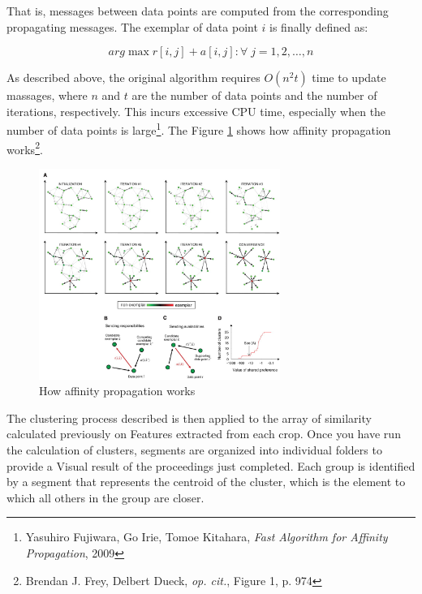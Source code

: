 That is, messages between data points are computed from the corresponding propagating messages. The exemplar of data point $i$ is finally defined as:

$$arg \max {r[i, j] + a[i, j] : \forall \; j = 1, 2, \ldots,n}$$

As described above, the original algorithm requires $O(n^2 t)$ time to update massages, where $n$ and $t$ are the number of data points and the number of iterations, respectively.
This incurs excessive CPU time, especially when the number of data points is large\footnote{Yasuhiro Fujiwara, Go Irie, Tomoe Kitahara, \emph{Fast Algorithm for Affinity Propagation}, 2009}. The Figure \ref{fig:ap} shows how affinity propagation works\footnote{Brendan J. Frey, Delbert Dueck, \emph{op. cit.}, Figure 1, p. 974}.

\begin{figure}[H]
\centering
\includegraphics[width=0.7\textwidth]{images/ap.jpg}
\caption{How affinity propagation works}
\label{fig:ap}
\end{figure}


The clustering process described is then applied to the array of similarity calculated previously on Features extracted from each crop. Once you have run the calculation of clusters, segments are organized into individual folders to provide a Visual result of the proceedings just completed. Each group is identified by a segment that represents the centroid of the cluster, which is the element to which all others in the group are closer.